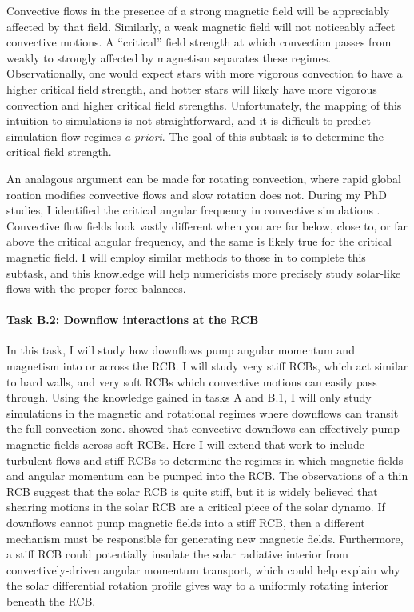 \documentclass[11pt, preprint]{aastex}
\begin{document}
Convective flows in the presence of a strong magnetic field will be appreciably affected by that field.
Similarly, a weak magnetic field will not noticeably affect convective motions.
A ``critical'' field strength at which convection passes from weakly to strongly affected by magnetism separates these regimes.
Observationally, one would expect stars with more vigorous convection to have a higher critical field strength, and hotter stars will likely have more vigorous convection and higher critical field strengths.
Unfortunately, the mapping of this intuition to simulations is not straightforward, and it is difficult to predict simulation flow regimes \emph{a priori}.
The goal of this subtask is to determine the critical field strength.

An analagous argument can be made for rotating convection, where rapid global roation modifies convective flows and slow rotation does not.
During my PhD studies, I identified the critical angular frequency in convective simulations \citep[][and Fig. \ref{fig:rossby_plot}]{anders&all2019}.
Convective flow fields look vastly different when you are far below, close to, or far above the critical angular frequency, and the same is likely true for the critical magnetic field.
I will employ similar methods to those in \citet{anders&all2019} to complete this subtask, and this knowledge will help numericists more precisely study solar-like flows with the proper force balances.

\vspace{-0.7cm}
\paragraph{Task B.2: Downflow interactions at the RCB}
\label{sct:taskB2}
In this task, I will study how downflows pump angular momentum and magnetism into or across the RCB.
I will study very stiff RCBs, which act similar to hard walls, and very soft RCBs which convective motions can easily pass through.
Using the knowledge gained in tasks A and B.1, I will only study simulations in the magnetic and rotational regimes where downflows can transit the full convection zone.
\citet{tobias&all1998} showed that convective downflows can effectively pump magnetic fields across soft RCBs.
Here I will extend that work to include turbulent flows and stiff RCBs to determine the regimes in which magnetic fields and angular momentum can be pumped into the RCB.
The observations of a thin RCB \citep{basu1997} suggest that the solar RCB is quite stiff, but it is widely believed that shearing motions in the solar RCB are a critical piece of the solar dynamo.
If downflows cannot pump magnetic fields into a stiff RCB, then a different mechanism must be responsible for generating new magnetic fields.
Furthermore, a stiff RCB could potentially insulate the solar radiative interior from convectively-driven angular momentum transport, which could help explain why the solar differential rotation profile gives way to a uniformly rotating interior beneath the RCB.
\end{document}

